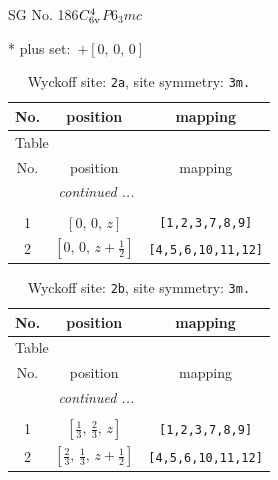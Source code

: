 \documentclass[fleqn,8pt]{jsarticle}
\begin{document}
\setcounter{MaxMatrixCols}{32}

\renewcommand{\tablename}{Table~}
\renewcommand{\figurename}{Figure~}
\begin{center}
\LARGE
SG No. 186\quad$C_{\rm 6v}^{4}$\quad$P6_3mc$\quad[ hexagonal ]
\end{center}
* plus set:\,\,\,$+\left[ 0,\, 0,\, 0 \right]$
\renewcommand{\arraystretch}{1.2}
\begin{longtable}{ccc}
\caption{Wyckoff site: {\tt 2a}, site symmetry: {\tt 3m.}}
 \\
 \hline \hline
No. & position & mapping \\ \hline \endfirsthead

\multicolumn{2}{l}{\tablename\ \thetable{}} \\
 \hline \hline
No. & position & mapping \\ \hline \endhead

 \hline \hline
\multicolumn{2}{r}{\footnotesize\it continued ...} \\ \endfoot

 \hline \hline
\multicolumn{2}{r}{} \\ \endlastfoot

1 & $\left[ 0,\, 0,\, z \right]$ & {\tt [1,2,3,7,8,9]} \\ \hline
2 & $\left[ 0,\, 0,\, z + \frac{1}{2} \right]$ & {\tt [4,5,6,10,11,12]} \\
\end{longtable}
\renewcommand{\arraystretch}{1.2}
\begin{longtable}{ccc}
\caption{Wyckoff site: {\tt 2b}, site symmetry: {\tt 3m.}}
 \\
 \hline \hline
No. & position & mapping \\ \hline \endfirsthead

\multicolumn{2}{l}{\tablename\ \thetable{}} \\
 \hline \hline
No. & position & mapping \\ \hline \endhead

 \hline \hline
\multicolumn{2}{r}{\footnotesize\it continued ...} \\ \endfoot

 \hline \hline
\multicolumn{2}{r}{} \\ \endlastfoot

1 & $\left[ \frac{1}{3},\, \frac{2}{3},\, z \right]$ & {\tt [1,2,3,7,8,9]} \\ \hline
2 & $\left[ \frac{2}{3},\, \frac{1}{3},\, z + \frac{1}{2} \right]$ & {\tt [4,5,6,10,11,12]} \\
\end{longtable}
\end{document}
